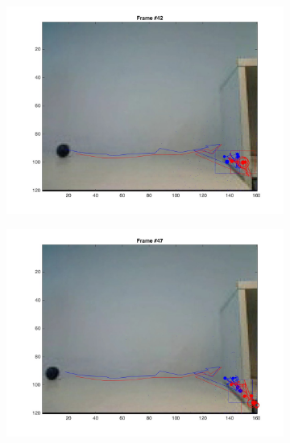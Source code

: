 \documentclass{ethz_report}
\begin{document}
\begin{figure}[h]
\begin{subfigure}[b]{.25\textwidth}
        \includegraphics[width=1\linewidth]{images/video3_noise_high_41}
    \end{subfigure}%
    \begin{subfigure}[b]{.25\textwidth}
        \centering
        \includegraphics[width=1\linewidth]{images/video3_noise_high_46}
    \end{subfigure}%
    \begin{subfigure}[b]{.25\textwidth}
        \centering

\end{subfigure}
\end{figure}
\end{document}
